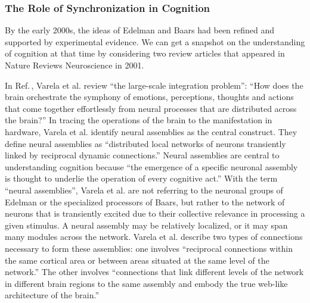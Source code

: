 \subsubsection{The Role of Synchronization in Cognition}
By the early 2000s, the ideas of Edelman and Baars had been refined and supported by experimental evidence. We can get a snapshot on the understanding of cognition at that time by considering two review articles that appeared in Nature Reviews Neuroscience in 2001. 

In Ref.\,\cite{vala2001}, Varela et al. review ``the large-scale integration problem'': ``How does the brain orchestrate the symphony of emotions, perceptions, thoughts and actions that come together effortlessly from neural processes that are distributed across the brain?'' In tracing the operations of the brain to the manifestation in hardware, Varela et al. identify neural assemblies as the central construct. They define neural assemblies as ``distributed local networks of neurons transiently linked by reciprocal dynamic connections.'' Neural assemblies are central to understanding cognition because ``the emergence of a specific neuronal assembly is thought to underlie the operation of every cognitive act.'' With the term ``neural assemblies'', Varela et al. are not referring to the neuronal groups of Edelman or the specialized processors of Baars, but rather to the network of neurons that is transiently excited due to their collective relevance in processing a given stimulus. A neural assembly may be relatively localized, or it may span many modules across the network. Varela et al. describe two types of connections necessary to form these assemblies: one involves ``reciprocal connections within the same cortical area or between areas situated at the same level of the network.'' The other involves ``connections that link different levels of the network in different brain regions to the same assembly and embody the true web-like architecture of the brain.''

